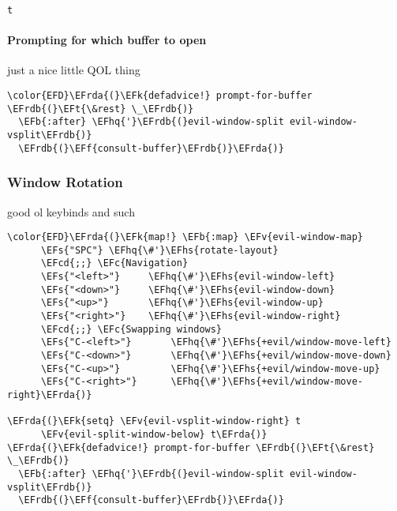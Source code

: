 \documentclass{article}
\newcommand{\EFc}[1]{\textcolor{EFc}{#1}} %
\newcommand{\EFcd}[1]{\textcolor{EFcd}{#1}} %
\newcommand{\EFs}[1]{\textcolor{EFs}{#1}} %
\newcommand{\EFk}[1]{\textcolor{EFk}{#1}} %
\newcommand{\EFb}[1]{\textcolor{EFb}{#1}} %
\newcommand{\EFf}[1]{\textcolor{EFf}{#1}} %
\newcommand{\EFv}[1]{\textcolor{EFv}{#1}} %
\newcommand{\EFt}[1]{\textcolor{EFt}{#1}} %
\newcommand{\EFhq}[1]{#1} %
\newcommand{\EFhs}[1]{\textcolor{EFhs}{#1}} %
\newcommand{\EFrda}[1]{\textcolor{EFrda}{#1}} %
\newcommand{\EFrdb}[1]{\textcolor{EFrdb}{#1}} %
\begin{document}
\begin{verbatim}
t
\end{verbatim}

\paragraph{Prompting for which buffer to open}
\label{sec:org1a7edaa}
just a nice little QOL thing
\begin{Code}
\begin{Verbatim}
\color{EFD}\EFrda{(}\EFk{defadvice!} prompt-for-buffer \EFrdb{(}\EFt{\&rest} \_\EFrdb{)}
  \EFb{:after} \EFhq{'}\EFrdb{(}evil-window-split evil-window-vsplit\EFrdb{)}
  \EFrdb{(}\EFf{consult-buffer}\EFrdb{)}\EFrda{)}
\end{Verbatim}
\end{Code}

\subsubsection{Window Rotation}
\label{sec:org720ee9e}
good ol keybinds and such
\begin{Code}
\begin{Verbatim}
\color{EFD}\EFrda{(}\EFk{map!} \EFb{:map} \EFv{evil-window-map}
      \EFs{"SPC"} \EFhq{\#'}\EFhs{rotate-layout}
      \EFcd{;;} \EFc{Navigation}
      \EFs{"<left>"}     \EFhq{\#'}\EFhs{evil-window-left}
      \EFs{"<down>"}     \EFhq{\#'}\EFhs{evil-window-down}
      \EFs{"<up>"}       \EFhq{\#'}\EFhs{evil-window-up}
      \EFs{"<right>"}    \EFhq{\#'}\EFhs{evil-window-right}
      \EFcd{;;} \EFc{Swapping windows}
      \EFs{"C-<left>"}       \EFhq{\#'}\EFhs{+evil/window-move-left}
      \EFs{"C-<down>"}       \EFhq{\#'}\EFhs{+evil/window-move-down}
      \EFs{"C-<up>"}         \EFhq{\#'}\EFhs{+evil/window-move-up}
      \EFs{"C-<right>"}      \EFhq{\#'}\EFhs{+evil/window-move-right}\EFrda{)}

\EFrda{(}\EFk{setq} \EFv{evil-vsplit-window-right} t
      \EFv{evil-split-window-below} t\EFrda{)}
\EFrda{(}\EFk{defadvice!} prompt-for-buffer \EFrdb{(}\EFt{\&rest} \_\EFrdb{)}
  \EFb{:after} \EFhq{'}\EFrdb{(}evil-window-split evil-window-vsplit\EFrdb{)}
  \EFrdb{(}\EFf{consult-buffer}\EFrdb{)}\EFrda{)}
\end{Verbatim}
\end{Code}
\end{document}
